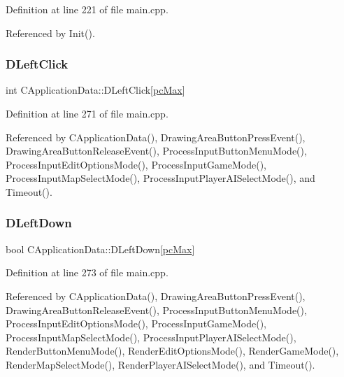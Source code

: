 Definition at line 221 of file main.\+cpp.



Referenced by Init().

\hypertarget{classCApplicationData_a8a86bb4c7cba7b119121401dda4ca68b}{}\label{classCApplicationData_a8a86bb4c7cba7b119121401dda4ca68b} 
\subsubsection{\texorpdfstring{D\+Left\+Click}{DLeftClick}}
{\footnotesize\ttfamily int C\+Application\+Data\+::\+D\+Left\+Click\mbox{[}\hyperlink{GameDataTypes_8h_aafb0ca75933357ff28a6d7efbdd7602fa594a5c8dd3987f24e8a0f23f1a72cd34}{pc\+Max}\mbox{]}\hspace{0.3cm}{\ttfamily [protected]}}



Definition at line 271 of file main.\+cpp.



Referenced by C\+Application\+Data(), Drawing\+Area\+Button\+Press\+Event(), Drawing\+Area\+Button\+Release\+Event(), Process\+Input\+Button\+Menu\+Mode(), Process\+Input\+Edit\+Options\+Mode(), Process\+Input\+Game\+Mode(), Process\+Input\+Map\+Select\+Mode(), Process\+Input\+Player\+A\+I\+Select\+Mode(), and Timeout().

\hypertarget{classCApplicationData_a2b943f18557c3e4c8cd4550e22e028b6}{}\label{classCApplicationData_a2b943f18557c3e4c8cd4550e22e028b6} 
\subsubsection{\texorpdfstring{D\+Left\+Down}{DLeftDown}}
{\footnotesize\ttfamily bool C\+Application\+Data\+::\+D\+Left\+Down\mbox{[}\hyperlink{GameDataTypes_8h_aafb0ca75933357ff28a6d7efbdd7602fa594a5c8dd3987f24e8a0f23f1a72cd34}{pc\+Max}\mbox{]}\hspace{0.3cm}{\ttfamily [protected]}}



Definition at line 273 of file main.\+cpp.



Referenced by C\+Application\+Data(), Drawing\+Area\+Button\+Press\+Event(), Drawing\+Area\+Button\+Release\+Event(), Process\+Input\+Button\+Menu\+Mode(), Process\+Input\+Edit\+Options\+Mode(), Process\+Input\+Game\+Mode(), Process\+Input\+Map\+Select\+Mode(), Process\+Input\+Player\+A\+I\+Select\+Mode(), Render\+Button\+Menu\+Mode(), Render\+Edit\+Options\+Mode(), Render\+Game\+Mode(), Render\+Map\+Select\+Mode(), Render\+Player\+A\+I\+Select\+Mode(), and Timeout().

